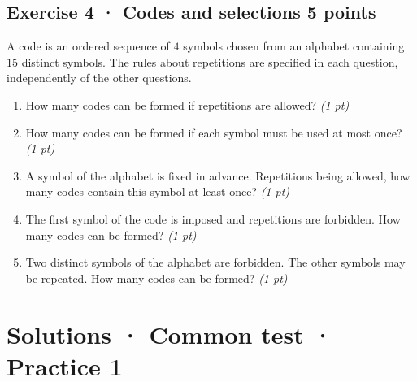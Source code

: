 \subsection*{Exercise 4 · Codes and selections \hfill 5 points}A code is an ordered sequence of $4$ symbols chosen from an alphabet containing $15$ distinct symbols. The rules about repetitions are specified in each question, independently of the other questions.

\begin{enumerate}

\item How many codes can be formed if repetitions are allowed? \hfill\textit{(1 pt)}

\item How many codes can be formed if each symbol must be used at most once? \hfill\textit{(1 pt)}

\item A symbol of the alphabet is fixed in advance. Repetitions being allowed, how many codes contain this symbol at least once? \hfill\textit{(1 pt)}

\item The first symbol of the code is imposed and repetitions are forbidden. How many codes can be formed? \hfill\textit{(1 pt)}

\item Two distinct symbols of the alphabet are forbidden. The other symbols may be repeated. How many codes can be formed? \hfill\textit{(1 pt)}

\end{enumerate}

\ifmxteacher\mxnewpage

\section*{Solutions · Common test · Practice 1}\label{cor:3-1}

